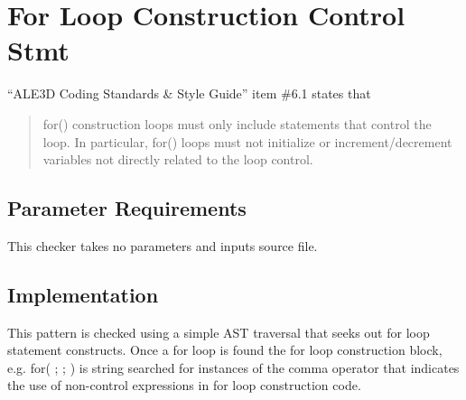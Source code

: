 %
%

\section{For Loop Construction Control Stmt}
\label{ForLoopConstructionControlStmt::overview}

``ALE3D Coding Standards \& Style Guide'' item \#6.1 states that
\begin{quote}
for() construction loops must only include statements that control the loop. In particular, for() loops must not initialize or increment/decrement variables not directly related to the loop control.
\end{quote}

\subsection{Parameter Requirements}
This checker takes no parameters and inputs source file.

\subsection{Implementation}
This pattern is checked using a simple AST traversal that seeks out for loop statement constructs. Once a for loop is found the for loop construction block, e.g. for( ; ; ) is string searched for instances of the comma operator that indicates the use of non-control expressions in for loop construction code.

